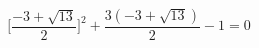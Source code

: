 \documentclass[preview]{standalone}
\begin{document}
\begin{align*}
\big[ \dfrac{-3 + \sqrt{13} } {2} 
] ^2  + \dfrac{ 3(-3 + \sqrt{13}) }{2}  -1 = 0
\end{align*}
\end{document}
